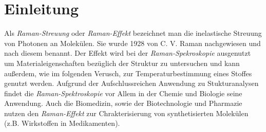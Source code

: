 \documentclass[../bericht.tex]{subfiles}
\begin{document}
  \chapter{Einleitung}

    Als \textit{Raman-Streuung} oder \textit{Raman-Effekt} bezeichnet man die inelastische Streuung von Photonen an Molekülen. Sie wurde 1928 von C. V. Raman nachgewiesen und nach diesem benannt. Der Effekt wird bei der \textit{Raman-Spekroskopie} ausgenutzt um Materialeigenschaften bezüglich der Struktur zu untersuchen und kann außerdem, wie im folgenden Verusch, zur Temperaturbestimmung eines Stoffes genutzt werden. Aufgrund der Aufschlussreichen Anwendung zu Stukturanalysen findet die \textit{Raman-Spektroskopie} vor Allem in der Chemie und Biologie seine Anwendung. Auch die Biomedizin, sowie der Biotechnologie und Pharmazie nutzen den \textit{Raman-Effekt} zur Chrakterisierung von synthetisierten Molekülen (z.B. Wirkstoffen in Medikamenten).
\end{document}
